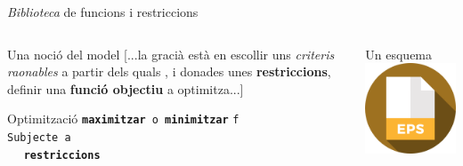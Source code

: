 \documentclass[twocolumn]{beamer}
\begin{document}
\begin{frame}{\textit{Biblioteca} de funcions i restriccions}
\begin{columns}[t]
	\begin{column}{.5\textwidth}
		\begin{block}{Una noció del model}
			[...la gracià està en escollir uns \emph{criteris raonables}
			a partir dels quals , i donades unes \textbf{restriccions}, definir una \textbf{funció objectiu} a optimitza...]
		\end{block}
		
		\begin{block}{Optimització}
			\texttt{\textbf{maximitzar} o \textbf{minimitzar}} \texttt{f}
			\\ 
			\texttt{Subjecte a}
			\\
			$\quad $ \texttt{\textbf{restriccions}}
		\end{block}
	\end{column}
	\begin{column}{.5\textwidth}
		\begin{block}{Un esquema}
			\includegraphics[width=5cm]{eps}
		\end{block}
	\end{column}
\end{columns}
\end{frame}
\end{document}
